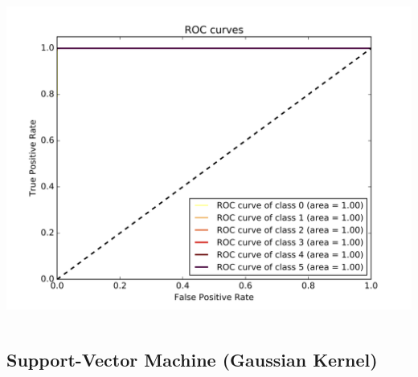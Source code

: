 \documentclass[c]{beamer}
\begin{document}
\begin{frame}
\begin{columns}
\begin{column}{0.6\textwidth}
      \centering\vfill
      \includegraphics[scale=0.18]{../../data/France/test/Nearest_Neighboors_Classification/Nearest_Neighboors_Classification_roc.png}
\end{column}

\end{columns}
\end{frame}


\subsection{Support-Vector Machine (Gaussian Kernel)}
\begin{frame}
\tableofcontents[currentsubsection]
\end{frame}
\end{document}
